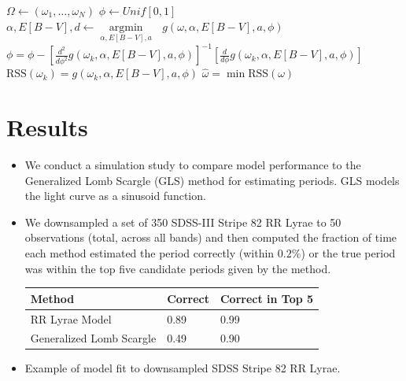 \documentclass[a0,portrait]{a0poster}
\newcommand{\argmin}[1]{\underset{#1}{\operatorname{argmin}}\text{ }}
\begin{document}
\begin{multicols}{2}
\begin{itemize}
\begin{algorithmic}[1]
  \State $\Omega \gets (\omega_1,\ldots,\omega_N)$ 
  \State $\phi \gets Unif[0,1]$ 
  \State $\alpha,E[B-V],d \gets \argmin{\alpha,E[B-V],a} g(\omega,\alpha,E[B-V],a,\phi)$  
  \State $\phi = \phi - \left[\frac{d^2}{d\phi^2}g(\omega_k,\alpha,E[B-V],a,\phi)\right]^{-1}\left[\frac{d}{d\phi}g(\omega_k,\alpha,E[B-V],a,\phi)\right] $ 
  \EndFor
  \State $\text{RSS}(\omega_k) = g(\omega_k,\alpha,E[B-V],a,\phi)$
  \EndFor
  \State $\widehat{\omega} = \min \text{RSS}(\omega)$
\end{algorithmic}

\end{itemize}


\section*{Results}

\begin{itemize}

\item We conduct a simulation study to compare model performance to the Generalized Lomb Scargle (GLS) method for estimating periods. GLS models the light curve as a sinusoid function.

\item We downsampled a set of 350 SDSS-III Stripe 82 RR Lyrae to 50 observations (total, across all bands) and then computed the fraction of time each method estimated the period correctly (within $0.2\%$) or the true period was within the top five candidate periods given by the method.

\begin{center}
\begin{tabular}{l l l}
\toprule
\textbf{Method} & \textbf{Correct} & \textbf{Correct in Top 5}\\
\midrule
RR Lyrae Model  & 0.89 & 0.99 \\
Generalized Lomb Scargle & 0.49  &  0.90\\
\bottomrule
\end{tabular}
\end{center}

\item Example of model fit to downsampled SDSS Stripe 82 RR Lyrae.


\end{itemize}
\end{multicols}
\end{document}
